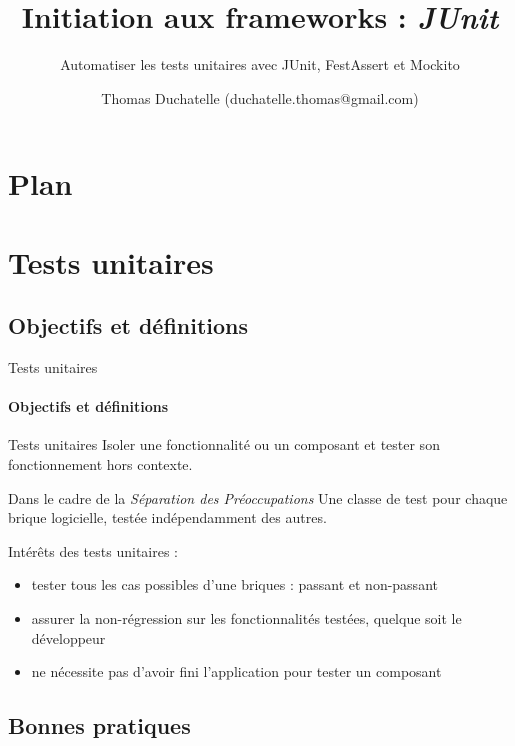 \documentclass[compress]{beamer}%
\title{Initiation aux frameworks : \emph{JUnit}}
\subtitle{Automatiser les tests unitaires avec JUnit, FestAssert et Mockito}
\author{Thomas Duchatelle (duchatelle.thomas@gmail.com)}
\institute{Capgemini, pour Yves Rocher}
\begin{document}
\frame{\titlepage}
  
\section*{Plan}
\frame{\tableofcontents[hideallsubsections]}



\section{Tests unitaires}

\subsection{Objectifs et définitions}

\begin{frame}{Tests unitaires}
	\framesubtitle{Objectifs et définitions}
	
	\begin{block}{Tests unitaires}
		Isoler une fonctionnalité ou un composant et tester son fonctionnement hors contexte. 
	\end{block}
	
	\pause
	\begin{block}{Dans le cadre de la \emph{Séparation des Préoccupations}}
		Une classe de test pour chaque brique logicielle, testée indépendamment des autres.
	\end{block}
	
\end{frame}

\begin{frame}
	
	Intérêts des tests unitaires :
	\begin{itemize}[<+->]
	\item tester tous les cas possibles d'une briques : passant et non-passant
	\item assurer la non-régression sur les fonctionnalités testées, quelque soit le développeur
	\item ne nécessite pas d'avoir fini l'application pour tester un composant
	\end{itemize}
	
\end{frame}

\subsection{Bonnes pratiques}
\end{document}
